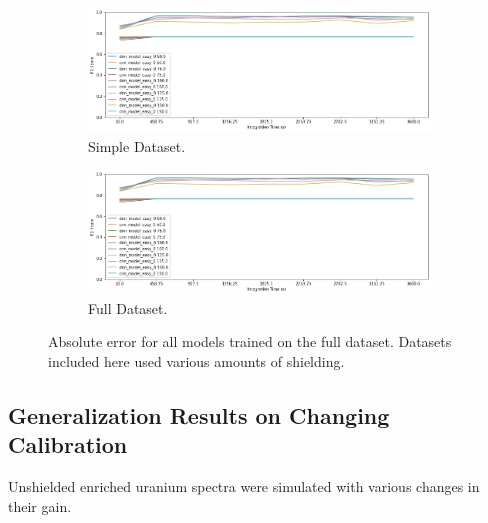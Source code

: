 \begin{figure}[H]
     \centering
     \begin{subfigure}[b]{0.9\textwidth}
         \centering
         \includegraphics[width=\textwidth]{images/results_easy_distance_comparison}
         \caption{Simple Dataset.}
         \label{fig:results_full_background_inject_simple}
     \end{subfigure}

     \begin{subfigure}[b]{0.9\textwidth}
         \centering
         \includegraphics[width=\textwidth]{images/results_easy_distance_comparison}
         \caption{Full Dataset.}
         \label{fig:results_full_background_inject_full}
     \end{subfigure}
        \caption{Absolute error for all models trained on the full dataset. Datasets included here used various amounts of shielding.}
        \label{fig:results_full_background_inject}
\end{figure}



\subsection{Generalization Results on Changing Calibration}

Unshielded enriched uranium spectra were simulated with various changes in their gain.  


